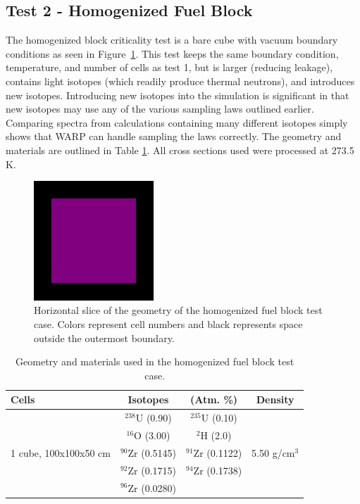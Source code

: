 \documentclass[preprint,12pt]{elsarticle}
\begin{document}
\newpage
\subsection{Test 2 - Homogenized Fuel Block}

The homogenized block criticality test is a bare cube with vacuum boundary conditions as seen in Figure~\ref{homfuel_geom_pic}.  This test keeps the same boundary condition, temperature, and number of cells as test 1, but is larger (reducing leakage), contains light isotopes (which readily produce thermal neutrons), and introduces new isotopes.  Introducing new isotopes into the simulation is significant in that new isotopes may use any of the various sampling laws outlined earlier.  Comparing spectra from calculations containing many different isotopes simply shows that WARP can handle sampling the laws correctly.  The geometry and materials are outlined in Table \ref{homfuel_geom}.  All cross sections used were processed at 273.5 K.

\begin{figure}[h!] 
  \centering
    \includegraphics[width=0.4\textwidth]{graphics/homfuel-xy.png}
     \caption{ Horizontal slice of the geometry of the homogenized fuel block test case.  Colors represent cell numbers and black represents space outside the outermost boundary. \label{homfuel_geom_pic} }
\end{figure}

\begin{table}[h]
\centering
\caption{Geometry and materials used in the homogenized fuel block test case.}
\label{homfuel_geom}
\begin{tabular}{| l | c  c | c |}
\hline
Cells & Isotopes & (Atm. \%)& Density \\
\hline
\multirow{5}{*}{1 cube, 100x100x50 cm }            &   $^{238}$U   (0.90)   &  $^{235}$U   (0.10)   &  \multirow{5}{*}{5.50 g/cm$^3$} \\
                                                   &   $^{16}$O    (3.00)   &  $^{2}$H     (2.0)    &  \\
                                                   &   $^{90}$Zr   (0.5145) &  $^{91}$Zr   (0.1122) &  \\
                                                   &   $^{92}$Zr   (0.1715) &  $^{94}$Zr   (0.1738) &  \\
                                                   &   $^{96}$Zr   (0.0280) &                       &  \\
\hline
\end{tabular}
\end{table}
\end{document}

